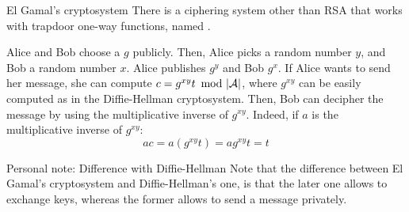 \documentclass[a4paper]{article}
\begin{document}
\begin{parag}{El Gamal's cryptosystem}
    There is a ciphering system other than RSA that works with trapdoor one-way functions, named .

    Alice and Bob choose a $g$ publicly. Then, Alice picks a random number $y$, and Bob a random number $x$. Alice publishes $g^y$ and Bob $g^x$. If Alice wants to send her message, she can compute $c = g^{xy}t\ \Mod\ \left|\mathcal{A}\right|$, where $g^{xy}$ can be easily computed as in the Diffie-Hellman cryptosystem. Then, Bob can decipher the message by using the multiplicative inverse of $g^{xy}$. Indeed, if $a$ is the multiplicative inverse of $g^{xy}$:
    \[ac = a\left(g^{xy} t\right) = a g^{xy} t = t\]

    \begin{subparag}{Personal note: Difference with Diffie-Hellman}
        Note that the difference between El Gamal's cryptosystem and Diffie-Hellman's one, is that the later one allows to exchange keys, whereas the former allows to send a message privately.
    \end{subparag}
\end{parag}
\end{document}
